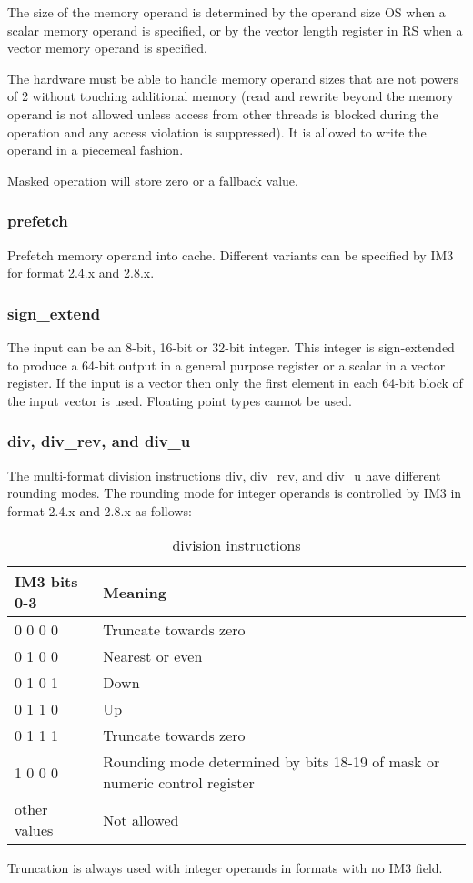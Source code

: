 \documentclass[forwardcom.tex]{subfiles}
\begin{document}
The size of the memory operand is determined by the operand size OS when a scalar memory operand is specified, or by the vector length register in RS when a vector memory operand is specified.
\vspace{2mm}

The hardware must be able to handle memory operand sizes that are not powers of 2 without touching additional memory (read and rewrite beyond the memory operand is not allowed unless access from other threads is blocked during the operation and any access violation is suppressed). It is allowed to write the operand in a piecemeal fashion.
\vspace{2mm}

Masked operation will store zero or a fallback value. 
\vspace{2mm}


\subsubsection{prefetch}
Prefetch memory operand into cache. Different variants can be specified by IM3 for format 2.4.x and 2.8.x.

\subsubsection{sign\_extend}
The input can be an 8-bit, 16-bit or 32-bit integer. This integer is sign-extended to produce a 64-bit output in a general purpose register or a scalar in a vector register. If the input is a vector then only the first element in each 64-bit block of the input vector is used. Floating point types cannot be used.

\subsubsection{div, div\_rev, and div\_u}
The multi-format division instructions div, div\_rev, and div\_u have different rounding modes. The rounding mode for integer operands is controlled by IM3 in format 2.4.x and 2.8.x as follows:

\begin{longtable} {|p{25mm}|p{80mm}|}
\caption{division instructions} 
\label{table:DivInstructions} \\
\endfirsthead
\endhead
\hline
\bfseries IM3 bits 0-3 & \bfseries Meaning   \\
\hline
 0 0 0 0 & Truncate towards zero \\
\hline
 0 1 0 0 & Nearest or even \\
 0 1 0 1 & Down \\
 0 1 1 0 & Up \\
 0 1 1 1 & Truncate towards zero \\
\hline
 1 0 0 0 & Rounding mode determined by bits 18-19 of mask or numeric control register \\
\hline
other values & Not allowed \\ 
\hline
\end{longtable}
Truncation is always used with integer operands in formats with no IM3 field.
\end{document}
